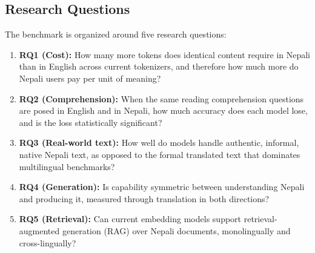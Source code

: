 \documentclass[conference]{IEEEtran}
\begin{document}
\subsection{Research Questions}
The benchmark is organized around five research questions:
\begin{enumerate}
\item \textbf{RQ1 (Cost):} How many more tokens does identical content require in Nepali than in English across current tokenizers, and therefore how much more do Nepali users pay per unit of meaning?
\item \textbf{RQ2 (Comprehension):} When the same reading comprehension questions are posed in English and in Nepali, how much accuracy does each model lose, and is the loss statistically significant?
\item \textbf{RQ3 (Real-world text):} How well do models handle authentic, informal, native Nepali text, as opposed to the formal translated text that dominates multilingual benchmarks?
\item \textbf{RQ4 (Generation):} Is capability symmetric between understanding Nepali and producing it, measured through translation in both directions?
\item \textbf{RQ5 (Retrieval):} Can current embedding models support retrieval-augmented generation (RAG) over Nepali documents, monolingually and cross-lingually?
\end{enumerate}
\end{document}
